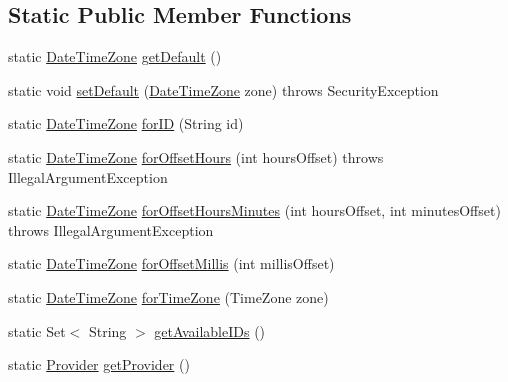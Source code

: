 \subsection*{Static Public Member Functions}
\begin{DoxyCompactItemize}
\item 
static \hyperlink{classorg_1_1joda_1_1time_1_1_date_time_zone}{Date\-Time\-Zone} \hyperlink{classorg_1_1joda_1_1time_1_1_date_time_zone_ad40e9def47666b63e67414456b2d7e2e}{get\-Default} ()
\item 
static void \hyperlink{classorg_1_1joda_1_1time_1_1_date_time_zone_a320b4c76e8a4eaf8c399b2dff4cccd38}{set\-Default} (\hyperlink{classorg_1_1joda_1_1time_1_1_date_time_zone}{Date\-Time\-Zone} zone)  throws Security\-Exception 
\item 
static \hyperlink{classorg_1_1joda_1_1time_1_1_date_time_zone}{Date\-Time\-Zone} \hyperlink{classorg_1_1joda_1_1time_1_1_date_time_zone_af5e08f59a41063611e2b4f75013167d1}{for\-I\-D} (String id)
\item 
static \hyperlink{classorg_1_1joda_1_1time_1_1_date_time_zone}{Date\-Time\-Zone} \hyperlink{classorg_1_1joda_1_1time_1_1_date_time_zone_ab4137f66d8869cdda3243b0a29697cb6}{for\-Offset\-Hours} (int hours\-Offset)  throws Illegal\-Argument\-Exception 
\item 
static \hyperlink{classorg_1_1joda_1_1time_1_1_date_time_zone}{Date\-Time\-Zone} \hyperlink{classorg_1_1joda_1_1time_1_1_date_time_zone_a4b964cdac557624de0c1e3584f3217e3}{for\-Offset\-Hours\-Minutes} (int hours\-Offset, int minutes\-Offset)  throws Illegal\-Argument\-Exception 
\item 
static \hyperlink{classorg_1_1joda_1_1time_1_1_date_time_zone}{Date\-Time\-Zone} \hyperlink{classorg_1_1joda_1_1time_1_1_date_time_zone_a98ca57323fc30a51a3b593ab7f646ae2}{for\-Offset\-Millis} (int millis\-Offset)
\item 
static \hyperlink{classorg_1_1joda_1_1time_1_1_date_time_zone}{Date\-Time\-Zone} \hyperlink{classorg_1_1joda_1_1time_1_1_date_time_zone_a2177c7585e90eba3c90cae278b1a3cfd}{for\-Time\-Zone} (Time\-Zone zone)
\item 
static Set$<$ String $>$ \hyperlink{classorg_1_1joda_1_1time_1_1_date_time_zone_a8a05b643eacaa76711e2dee68fe399a1}{get\-Available\-I\-Ds} ()
\item 
static \hyperlink{interfaceorg_1_1joda_1_1time_1_1tz_1_1_provider}{Provider} \hyperlink{classorg_1_1joda_1_1time_1_1_date_time_zone_a2220fa8b43d54c3c8b18461ed4707c94}{get\-Provider} ()
\item 

\end{DoxyCompactItemize}
